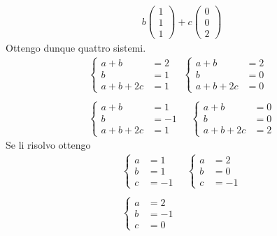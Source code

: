 \begin{example}
\begin{gather*}
		b \begin{pmatrix}
			1 \\ 1 \\ 1
		\end{pmatrix} +
		c \begin{pmatrix}
			0 \\ 0 \\ 2
		\end{pmatrix}
	\end{gather*}
	Ottengo dunque quattro sistemi.
	\begin{gather*}
		\begin{cases}
			a + b      & = 2 \\
			b          & = 1 \\
			a + b + 2c & = 1
		\end{cases}
		\quad
		\begin{cases}
			a + b      & = 2 \\
			b          & = 0 \\
			a + b + 2c & = 0
		\end{cases} \\
		\\
		\begin{cases}
			a + b      & = 1  \\
			b          & = -1 \\
			a + b + 2c & = 1
		\end{cases}
		\quad
		\begin{cases}
			a + b      & = 0 \\
			b          & = 0 \\
			a + b + 2c & = 2
		\end{cases}
	\end{gather*}
	Se li risolvo ottengo
	\begin{gather*}
		\begin{cases}
			a & = 1  \\
			b & = 1  \\
			c & = -1
		\end{cases}
		\quad
		\begin{cases}
			a & = 2  \\
			b & = 0  \\
			c & = -1
		\end{cases} \\
		\\
		\begin{cases}
			a & = 2  \\
			b & = -1 \\
			c & = 0
		\end{cases}

\end{gather*}
\end{example}
